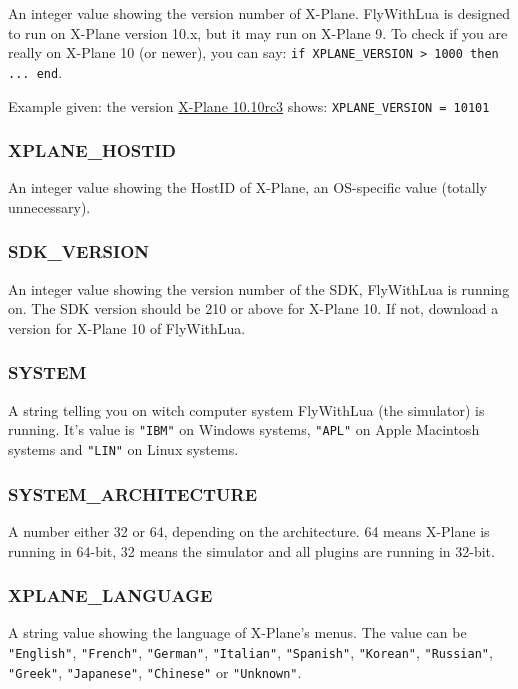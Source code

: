 \documentclass[11pt,parskip=half,a4paper]{scrartcl}
\begin{document}
An integer value showing the version number of X-Plane. FlyWithLua is designed to run on X-Plane version 10.x, but it may run on X-Plane 9. To check if you are really on X-Plane 10 (or newer), you can say: \verb|if XPLANE_VERSION > 1000 then ... end|.

Example given: the version \href{http://wiki.x-plane.com/Beta#X-Plane_10.10_RC_3}{X-Plane 10.10rc3} shows: \verb|XPLANE_VERSION = 10101|

\subsubsection{XPLANE\_HOSTID}

An integer value showing the HostID of X-Plane, an OS-specific value (totally unnecessary).

\subsubsection{SDK\_VERSION}

An integer value showing the version number of the SDK, FlyWithLua is running on. The SDK version should be 210 or above for X-Plane 10. If not, download a version for X-Plane 10 of FlyWithLua.

\subsubsection{SYSTEM}

A string telling you on witch computer system FlyWithLua (the simulator) is running. It's value is \verb|"IBM"| on Windows systems, \verb|"APL"| on Apple Macintosh systems and \verb|"LIN"| on Linux systems.

\subsubsection{SYSTEM\_ARCHITECTURE}

A number either 32 or 64, depending on the architecture. 64 means X-Plane is running in 64-bit, 32 means the simulator and all plugins are running in 32-bit.

\subsubsection{XPLANE\_LANGUAGE}

A string value showing the language of X-Plane's menus. The value can be \verb|"English"|, \verb|"French"|, \verb|"German"|, \verb|"Italian"|, \verb|"Spanish"|, \verb|"Korean"|, \verb|"Russian"|, \verb|"Greek"|, \verb|"Japanese"|, \verb|"Chinese"| or \verb|"Unknown"|.
\end{document}
